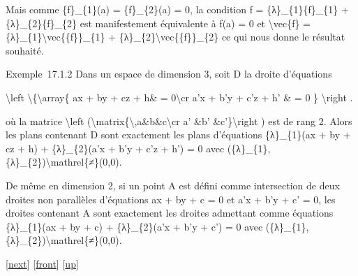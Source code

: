 \documentclass[]{article}
\begin{document}
Mais comme \{f\}\_\{1\}(a) = \{f\}\_\{2\}(a) = 0, la condition f =
\{λ\}\_\{1\}\{f\}\_\{1\} + \{λ\}\_\{2\}\{f\}\_\{2\} est manifestement
équivalente à f(a) = 0 et \textbackslash{}vec\{f\} =
\{λ\}\_\{1\}\textbackslash{}vec\{\{f\}\}\_\{1\} +
\{λ\}\_\{2\}\textbackslash{}vec\{\{f\}\}\_\{2\} ce qui nous donne le
résultat souhaité.

Exemple~17.1.2 Dans un espace de dimension 3, soit D la droite
d'équations

\textbackslash{}left \textbackslash{}\{\textbackslash{}array\{ ax + by +
cz + h\& = 0\textbackslash{}cr a'x + b'y + c'z + h' \& = 0 \}
\textbackslash{}right .

où la matrice \textbackslash{}left
(\textbackslash{}matrix\{\textbackslash{},a\&b\&c\textbackslash{}cr a'
\&b' \&c'\}\textbackslash{}right ) est de rang 2. Alors les plans
contenant D sont exactement les plans d'équations \{λ\}\_\{1\}(ax + by +
cz + h) + \{λ\}\_\{2\}(a'x + b'y + c'z + h') = 0 avec
(\{λ\}\_\{1\},\{λ\}\_\{2\})\textbackslash{}mathrel\{≠\}(0,0).

De même en dimension 2, si un point A est défini comme intersection de
deux droites non parallèles d'équations ax + by + c = 0 et a'x + b'y +
c' = 0, les droites contenant A sont exactement les droites admettant
comme équations \{λ\}\_\{1\}(ax + by + c) + \{λ\}\_\{2\}(a'x + b'y + c')
= 0 avec (\{λ\}\_\{1\},\{λ\}\_\{2\})\textbackslash{}mathrel\{≠\}(0,0).

{[}\href{coursse93.html}{next}{]} {[}\href{coursse92.html}{front}{]}
{[}\href{coursch18.html\#coursse92.html}{up}{]}
\end{document}

